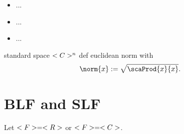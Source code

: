 \begin{proposition}
	\begin{itemize}
		\item ...
		\item ...
		\item ...
	\end{itemize}
\end{proposition}
\begin{definition}
	standard space $<C>^n$ def euclidean norm with
	\begin{align*}
		\norm{x} := \sqrt{\scaProd{x}{x}}.
	\end{align*}
\end{definition}
\section{BLF and SLF}
Let $<F> = <R>$ or $<F> = <C>$.
